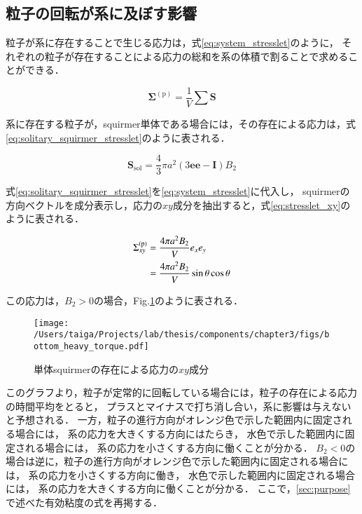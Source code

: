\subsection{粒子の回転が系に及ぼす影響}
粒子が系に存在することで生じる応力は，式\eqref{eq:system_stresslet}のように，
それぞれの粒子が存在することによる応力の総和を系の体積で割ることで求めることができる\cite{dilute_squirmer}．

    \begin{equation}
        \boldsymbol{\Sigma}^\mathrm{(p)} = \frac{1}{V} \sum \boldsymbol{S}
        \label{eq:system_stresslet}
    \end{equation}

\noindent
系に存在する粒子が，squirmer単体である場合には，その存在による応力は，式\eqref{eq:solitary_squirmer_stresslet}のように表される\cite{dilute_squirmer}．

    \begin{equation}
        \boldsymbol{S}_\mathrm{sol} = \frac{4}{3} \pi a^2 (3 \boldsymbol{ee} - \boldsymbol{I}) B_2
        \label{eq:solitary_squirmer_stresslet}
    \end{equation}

\noindent
式\eqref{eq:solitary_squirmer_stresslet}を\eqref{eq:system_stresslet}に代入し，
squirmerの方向ベクトルを成分表示し，応力の$xy$成分を抽出すると，式\eqref{eq:stresslet_xy}のように表される．

    \begin{align}
        \Sigma^\mathrm{(p)}_{xy} &= \frac{4 \pi a^2 B_2}{V} e_x e_y \notag \\
            &= \frac{4 \pi a^2 B_2}{V} \sin \theta \cos \theta
        \label{eq:stresslet_xy}
    \end{align}

\noindent
この応力は，$B_2 > 0$の場合，Fig.\ref{fig:stresslet_xy}のように表される．

    \begin{figure}[H]
        \centering
        \texttt{[image: /Users/taiga/Projects/lab/thesis/components/chapter3/figs/bottom\_heavy\_torque.pdf]}
        \caption{単体squirmerの存在による応力の$xy$成分}
        \label{fig:stresslet_xy}
    \end{figure}

\noindent
このグラフより，粒子が定常的に回転している場合には，粒子の存在による応力の時間平均をとると，
プラスとマイナスで打ち消し合い，系に影響は与えないと予想される．
一方，粒子の進行方向がオレンジ色で示した範囲内に固定される場合には，
系の応力を大きくする方向にはたらき，
水色で示した範囲内に固定される場合には，
系の応力を小さくする方向に働くことが分かる．
$B_2<0$の場合は逆に，粒子の進行方向がオレンジ色で示した範囲内に固定される場合には，
系の応力を小さくする方向に働き，
水色で示した範囲内に固定される場合には，
系の応力を大きくする方向に働くことが分かる．
ここで，\ref{sec:purpose}で述べた有効粘度の式を再掲する．

